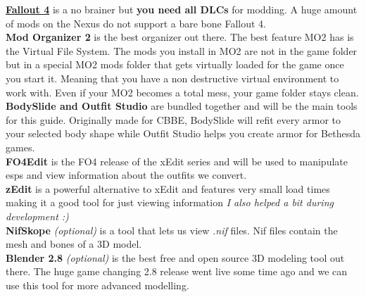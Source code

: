 \begin{flushleft}
    \href{https://www.youtube.com/watch?v=YPN0qhSyWy8}{\textbf{Fallout 4}} is a no brainer but \textbf{you need all DLCs} for modding. A huge amount of
    mods on the Nexus do not support a bare bone Fallout 4.\\
    \vspace{0.1cm}
    \textbf{Mod Organizer 2} is the best organizer out there. The best feature MO2 has is the Virtual File System. The mods you install in MO2 are not in the game folder but in a special 
    MO2 mods folder that gets virtually loaded for the game once you start it. Meaning that you have a non destructive virtual environment to work with.
    Even if your MO2 becomes a total mess, your game folder stays clean.\\
    \vspace{0.1cm}
    \textbf{BodySlide and Outfit Studio} are bundled together and will be the main tools for this guide. Originally made for CBBE, BodySlide will refit 
    every armor to your selected body shape while Outfit Studio helps you create armor for Bethesda games.\\
    \vspace{0.1cm}
    \textbf{FO4Edit} is the FO4 release of the xEdit series and will be used to manipulate esps and view information about the outfits we convert.\\
    \vspace{0.1cm}
    \textbf{zEdit} is a powerful alternative to xEdit and features very small load times making it a good tool for just viewing information \textit{I also helped a bit during development :)}\\
    \vspace{0.1cm}
    \textbf{NifSkope} \textit{(optional)} is a tool that lets us view \textit{.nif} files. Nif files contain the mesh and bones of a 3D model.\\
    \vspace{0.1cm}
    \textbf{Blender 2.8} \textit{(optional)} is the best free and open source 3D modeling tool out there. The huge game changing 2.8 release went live some time ago and we can use this tool for more advanced modelling.
\end{flushleft}